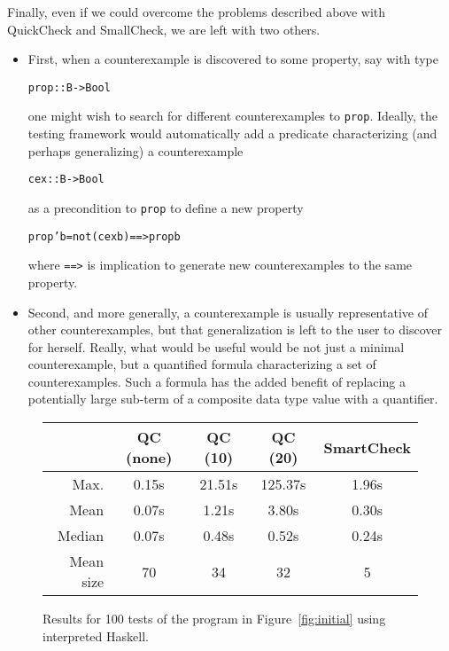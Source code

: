 \documentclass[10pt]{sigplanconf}
\newenvironment{code}{\begin{alltt}}{\end{alltt}}
\newcommand{\ttp}[1]{\texttt{#1}}
\begin{document}
Finally, even if we could overcome the problems described above with QuickCheck
and SmallCheck, we are left with two others.  
\begin{itemize}
  \item First, when a counterexample is discovered to some property, say with
    type
%
\begin{code}
prop :: B -> Bool      
\end{code}
%
\noindent
one might wish to search for different counterexamples to \ttp{prop}.  Ideally,
the testing framework would automatically add a predicate characterizing (and
perhaps generalizing) a counterexample
%
\begin{code}
cex :: B -> Bool      
\end{code}
%
\noindent
as a precondition to \ttp{prop} to define a new property
\begin{code}
prop' b = not (cex b) ==> prop b
\end{code}
%
\noindent
where \ttp{==>} is implication to generate new counterexamples to the same property.

  \item Second, and more generally, a counterexample is usually representative
    of other counterexamples, but that generalization is left to the user to
    discover for herself.  Really, what would be useful would be not just a
    minimal counterexample, but a quantified formula characterizing a set of
    counterexamples.  Such a formula has the added benefit of replacing a
    potentially large sub-term of a composite data type value with a quantifier.
\end{itemize}

\begin{figure}[ht]
\footnotesize
  \begin{center}
    \begin{tabular}{|r||c|c|c|c|}
\hline 
 & QC (none) & QC (10) & QC (20) & SmartCheck \\      
\hline \hline 
Max.  & 0.15s & 21.51s & 125.37s & 1.96s\\
\hline
Mean  & 0.07s & 1.21s & 3.80s & 0.30s\\
\hline
Median & 0.07s & 0.48s & 0.52s & 0.24s\\
\hline
Mean size & 70 & 34 & 32 & 5\\
\hline
    \end{tabular}
  \end{center}
  \caption{Results for 100 tests of the program in Figure~\ref{fig:initial}
    using interpreted Haskell.}
  \label{fig:results}
\end{figure}
\end{document}
